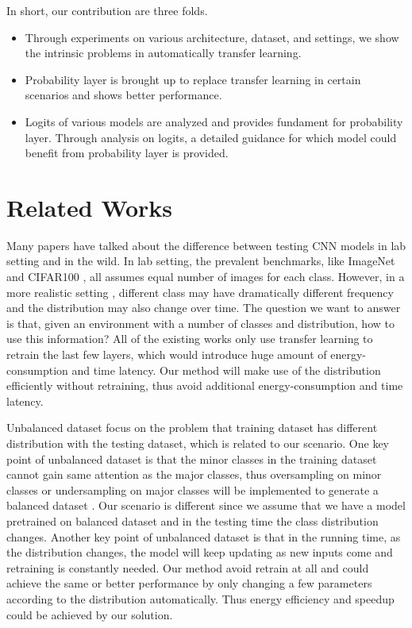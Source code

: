 \documentclass{article}
\begin{document}
In short, our contribution are three folds.
\begin{itemize}
    \item Through experiments on various architecture, dataset, and settings, we show the intrinsic problems in automatically transfer learning. 
    \item Probability layer is brought up to replace transfer learning in certain scenarios and shows better performance. 
    \item Logits of various models are analyzed and provides fundament for probability layer. Through analysis on logits, a detailed guidance for which model could benefit from probability layer is provided. 
\end{itemize}

\section{Related Works}
Many papers have talked about the difference between testing CNN models in lab setting and in the wild. In lab setting, the prevalent benchmarks, like ImageNet \cite{deng2009imagenet} and CIFAR100 \cite{krizhevsky2009learning}, all assumes equal number of images for each class. However, in a more realistic setting \cite{han2016mcdnn, shen2017fast}, different class may have dramatically different frequency and the distribution may also change over time. The question we want to answer is that, given an environment with a number of classes and distribution, how to use this information? All of the existing works \cite{han2016mcdnn, shen2017fast} only use transfer learning to retrain the last few layers, which would introduce huge amount of energy-consumption and time latency. Our method will make use of the distribution efficiently without retraining, thus avoid additional energy-consumption and time latency.

Unbalanced dataset focus on the problem that training dataset has different distribution with the testing dataset, which is related to our scenario. One key point of unbalanced dataset is that the minor classes in the training dataset cannot gain same attention as the major classes, thus oversampling on minor classes or undersampling on major classes will be implemented to generate a balanced dataset \cite{wang2016dealing}. Our scenario is different since we assume that we have a model pretrained on balanced dataset and in the testing time the class distribution changes. Another key point of unbalanced dataset is that in the running time, as the distribution changes, the model will keep updating as new inputs come and retraining is constantly needed. Our method avoid retrain at all and could achieve the same or better performance by only changing a few parameters according to the distribution automatically. Thus energy efficiency and speedup could be achieved by our solution.
\end{document}
